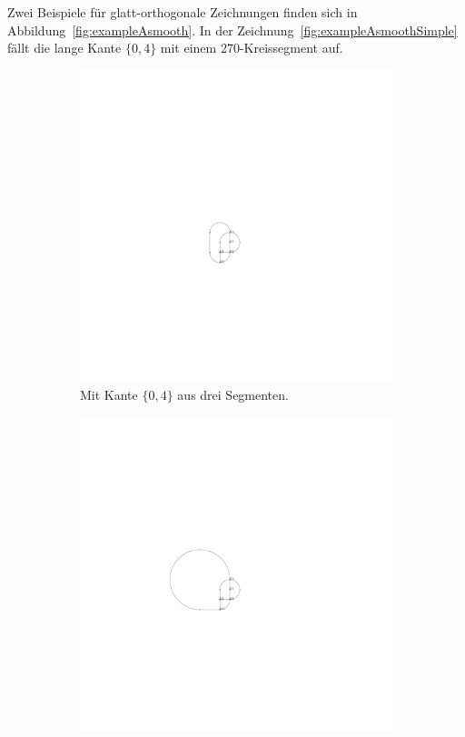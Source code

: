 \documentclass[a4paper]{scrreprt}
\theoremstyle{definition}
\begin{document}
Zwei Beispiele für glatt-orthogonale Zeichnungen finden sich in Abbildung~\ref{fig:exampleAsmooth}. In der Zeichnung~\ref{fig:exampleAsmoothSimple} fällt die lange Kante $\{0,4\}$ mit einem 270\textdegree-Kreissegment auf.

\begin{figure}[h]
  \centering
\begin{subfigure}[b]{0.3\textwidth}
  \centering
  \includegraphics{exampleA/smoothComplex}
  \caption{Mit Kante $\{0,4\}$ aus drei Segmenten.}
  \label{fig:exampleAsmoothComplex}
\end{subfigure}
  \quad
\begin{subfigure}[b]{0.6\textwidth}
  \centering
  \includegraphics{exampleA/smooth}

\end{subfigure}
\end{figure}
\end{document}
